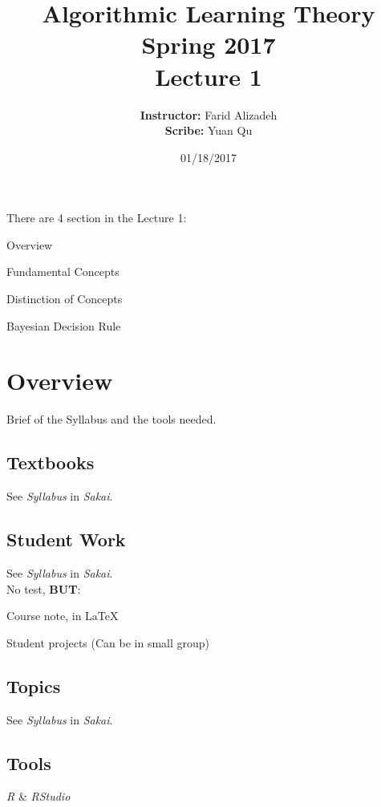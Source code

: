 \documentclass{article}
\title{ 
    Algorithmic Learning Theory\\
    Spring 2017\\
    Lecture 1
}
\author{
    {\bf Instructor:} Farid Alizadeh\\
    {\bf Scribe:} Yuan Qu
}
\date{01/18/2017}
\begin{document}
\pagestyle{fancy}

\maketitle

\medskip

There are 4 section in the Lecture 1:
\begin{enumerate}{
    \item Overview
    \item Fundamental Concepts
    \item Distinction of Concepts
    \item Bayesian Decision Rule  
}
\end{enumerate}

\section{Overview}{
    Brief of the Syllabus and the tools needed.
    \subsection{Textbooks}{
        See \textit{Syllabus} in \textit{Sakai}.
    }
    \subsection{Student Work}{
        See \textit{Syllabus} in \textit{Sakai}.\\
        No test, \textbf{BUT}:
        \begin{enumerate}{
            \item Course note, in LaTeX
            \item Student projects (Can be in small group)  
        }
        \end{enumerate}
    }
    \subsection{Topics}{
        See \textit{Syllabus} in \textit{Sakai}.
    }
    \subsection{Tools}{
        \textit{R} \& \textit{RStudio}
    }
}
\end{document}
